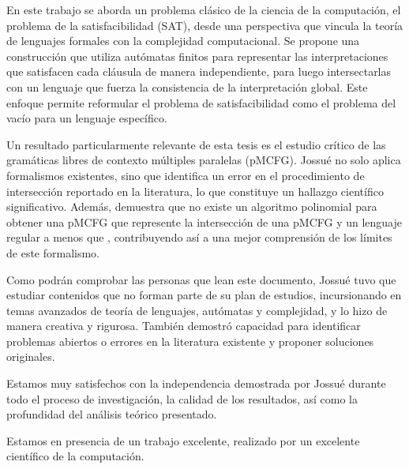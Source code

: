 \begin{opinion}
    En este trabajo se aborda un problema clásico de la ciencia de la computación, el problema de la satisfacibilidad (SAT), desde una perspectiva que vincula la teoría de lenguajes formales con la complejidad computacional. Se propone una construcción que utiliza autómatas finitos para representar las interpretaciones que satisfacen cada cláusula de manera independiente, para luego intersectarlas con un lenguaje que fuerza la consistencia de la interpretación global. Este enfoque permite reformular el problema de satisfacibilidad como el problema del vacío para un lenguaje específico.

    Un resultado particularmente relevante de esta tesis es el estudio crítico de las gramáticas libres de contexto múltiples paralelas (pMCFG). Jossué no solo aplica formalismos existentes, sino que identifica un error en el procedimiento de intersección reportado en la literatura, lo que constituye un hallazgo científico significativo. Además, demuestra que no existe un algoritmo polinomial para obtener una pMCFG que represente la intersección de una pMCFG y un lenguaje regular a menos que \pnp, contribuyendo así a una mejor comprensión de los límites de este formalismo.



    Como podrán comprobar las personas que lean este documento, Jossué tuvo que estudiar contenidos que no forman parte de su plan de estudios, incursionando en temas avanzados de teoría de lenguajes, autómatas y complejidad, y lo hizo de manera creativa y rigurosa. También demostró capacidad para identificar problemas abiertos o errores en la literatura existente y proponer soluciones originales.

    Estamos muy satisfechos con la independencia demostrada por Jossué durante todo el proceso de investigación, la calidad de los resultados, así como la profundidad del análisis teórico presentado.

    Estamos en presencia de un trabajo excelente, realizado por un excelente científico de la computación.


\end{opinion}
